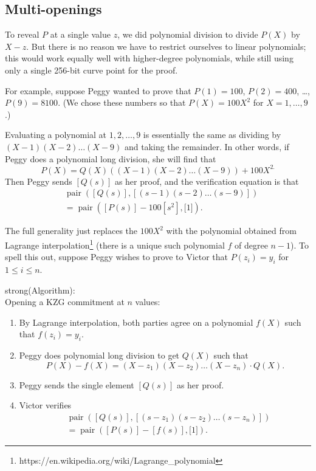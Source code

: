 \subsection{Multi-openings}\label{multi-openings}

To reveal \(P\) at a single value \(z\), we did polynomial division to
divide \(P(X)\) by \(X - z\). But there is no reason we have to restrict
ourselves to linear polynomials; this would work equally well with
higher-degree polynomials, while still using only a single 256-bit curve
point for the proof.

For example, suppose Peggy wanted to prove that \(P(1) = 100\),
\(P(2) = 400\), \ldots, \(P(9) = 8100\). (We chose these numbers so that
\(P(X) = 100X^{2}\) for \(X = 1,\ldots,9\).)

Evaluating a polynomial at \(1,2,\ldots,9\) is essentially the same as
dividing by \((X - 1)(X - 2)\ldots(X - 9)\) and taking the remainder. In
other words, if Peggy does a polynomial long division, she will find
that
\[P(X) = Q(X)\left( (X - 1)(X - 2)\ldots(X - 9) \right) + 100X^{2.}\]
Then Peggy sends \(\left\lbrack Q(s) \right\rbrack\) as her proof, and
the verification equation is that \[\begin{aligned}
 & \operatorname{pair}(\left\lbrack Q(s) \right\rbrack,\left\lbrack (s - 1)(s - 2)\ldots(s - 9) \right\rbrack) \\
 & = \operatorname{pair}(\left\lbrack P(s) \right\rbrack - 100\left\lbrack s^{2} \right\rbrack,\lbrack 1\rbrack).
\end{aligned}\]

The full generality just replaces the \(100X^{2}\) with the polynomial
obtained from Lagrange interpolation\footnote{https://en.wikipedia.org/wiki/Lagrange\_polynomial}
(there is a unique such polynomial \(f\) of degree \(n - 1\)). To spell
this out, suppose Peggy wishes to prove to Victor that
\(P\left( z_{i} \right) = y_{i}\) for \(1 \leq i \leq n\).

strong(Algorithm):\\
Opening a KZG commitment at \(n\) values:

\begin{enumerate}
\item
  By Lagrange interpolation, both parties agree on a polynomial \(f(X)\)
  such that \(f\left( z_{i} \right) = y_{i}\).
\item
  Peggy does polynomial long division to get \(Q(X)\) such that
  \[P(X) - f(X) = \left( X - z_{1} \right)\left( X - z_{2} \right)\ldots\left( X - z_{n} \right) \cdot Q(X).\]
\item
  Peggy sends the single element \(\left\lbrack Q(s) \right\rbrack\) as
  her proof.
\item
  Victor verifies \[\begin{aligned}
   & \operatorname{pair}(\left\lbrack Q(s) \right\rbrack,\left\lbrack \left( s - z_{1} \right)\left( s - z_{2} \right)\ldots\left( s - z_{n} \right) \right\rbrack) \\
   & = \operatorname{pair}(\left\lbrack P(s) \right\rbrack - \left\lbrack f(s) \right\rbrack,\lbrack 1\rbrack).
  \end{aligned}\]
\end{enumerate}

